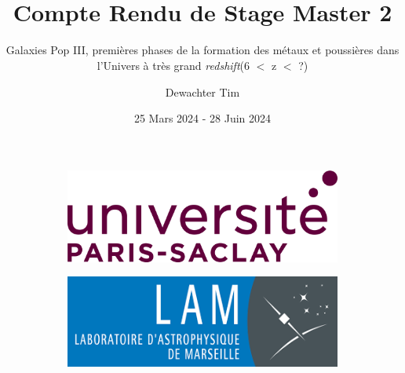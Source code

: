 \documentclass[12pt, a4paper]{article}
\title{\textbf{ \\{\Huge Compte Rendu de Stage Master 2}}}
\subtitle{Galaxies Pop III, premières phases de la formation des métaux et poussières dans l'Univers à très grand \textit{redshift}(6 $<$ z $<$ ?)}
\author{Dewachter Tim}
\date{25 Mars 2024 - 28 Juin 2024}
\begin{document}
\maketitle

\begin{figure}
  \centering
     \begin{subfigure}[b]{0.3\textwidth}
         \centering
         \includegraphics[width=\textwidth]{assets/paris-saclay.png}
     \end{subfigure}
     \hfill
     \begin{subfigure}[b]{0.3\textwidth}
         \centering
         \includegraphics[width=\textwidth]{assets/lam.png}
     \end{subfigure}
\end{figure}
\end{document}
